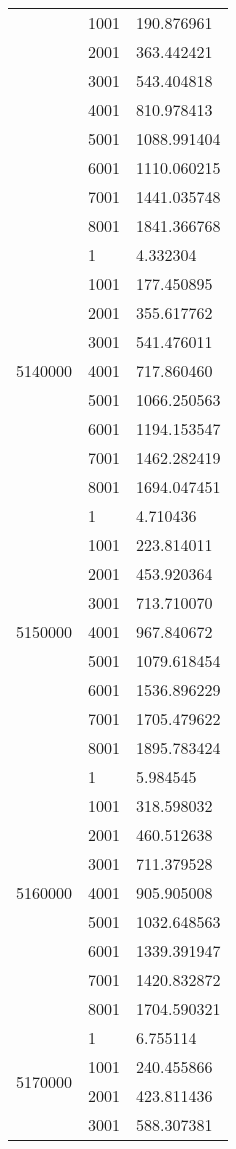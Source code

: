 \begin{table}[htb!]
\begin{tabular}{lll}
 & 1001 & 190.876961 \\
 & 2001 & 363.442421 \\
 & 3001 & 543.404818 \\
 & 4001 & 810.978413 \\
 & 5001 & 1088.991404 \\
 & 6001 & 1110.060215 \\
 & 7001 & 1441.035748 \\
 & 8001 & 1841.366768 \\
\multirow[c]{9}{*}{5140000} & 1 & 4.332304 \\
 & 1001 & 177.450895 \\
 & 2001 & 355.617762 \\
 & 3001 & 541.476011 \\
 & 4001 & 717.860460 \\
 & 5001 & 1066.250563 \\
 & 6001 & 1194.153547 \\
 & 7001 & 1462.282419 \\
 & 8001 & 1694.047451 \\
\multirow[c]{9}{*}{5150000} & 1 & 4.710436 \\
 & 1001 & 223.814011 \\
 & 2001 & 453.920364 \\
 & 3001 & 713.710070 \\
 & 4001 & 967.840672 \\
 & 5001 & 1079.618454 \\
 & 6001 & 1536.896229 \\
 & 7001 & 1705.479622 \\
 & 8001 & 1895.783424 \\
\multirow[c]{9}{*}{5160000} & 1 & 5.984545 \\
 & 1001 & 318.598032 \\
 & 2001 & 460.512638 \\
 & 3001 & 711.379528 \\
 & 4001 & 905.905008 \\
 & 5001 & 1032.648563 \\
 & 6001 & 1339.391947 \\
 & 7001 & 1420.832872 \\
 & 8001 & 1704.590321 \\
\multirow[c]{9}{*}{5170000} & 1 & 6.755114 \\
 & 1001 & 240.455866 \\
 & 2001 & 423.811436 \\
 & 3001 & 588.307381 \\

\end{tabular}
\end{table}
